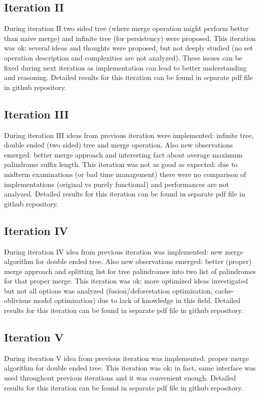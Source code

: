 \subsection{Iteration II}
During iteration II two sided tree (where merge operation might perform better than naive merge) and infinite tree (for persistency) were proposed. This iteration was ok: several ideas and thoughts were proposed, but not deeply studied (no set operation description and complexities are not analyzed). These issues can be fixed during next iteration as implementation can lead to better understanding and reasoning. Detailed results for this iteration can be found in separate pdf file\cite{khazhix2} in github repository.

\subsection{Iteration III}
During iteration III ideas from previous iteration were implemented: infinite tree, double ended (two sided) tree and merge operation. Also new observations emerged: better merge approach and interesting fact about average maximum palindrome suffix length. This iteration was not as good as
expected: due to midterm examinations (or bad time management) there were no comparison of implementations (original vs purely functional) and performances are not analyzed. Detailed results for this iteration can be found in separate pdf file\cite{khazhix3} in github repository.

\subsection{Iteration IV}
During iteration IV idea from previous iteration was implemented: new merge algorithm for double ended tree. Also new observations emerged: better (proper) merge approach and splitting list for tree palindromes into two list of palindromes for that proper merge. This iteration was ok: more optimized ideas investigated but not all options was analyzed (fusion/deforestation optimization, cache-oblivious model optimization) due to lack of knowledge in this field. Detailed results for this iteration can be found in separate pdf file\cite{khazhix4} in github repository.

\subsection{Iteration V}
During iteration V idea from previous iteration was implemented: proper merge algorithm for double ended tree. This iteration was ok: in fact, same interface was used throughout previous iterations and it was convenient enough.
Detailed results for this iteration can be found in separate pdf file\cite{khazhix5} in github repository.